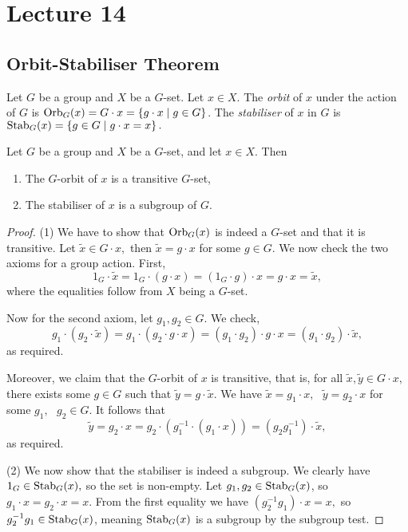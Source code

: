 \section{Lecture 14}
\subsection{Orbit-Stabiliser Theorem}
\begin{definition}
  Let $G$ be a group and $X$ be a $G$-set. Let $x\in X$. The \emph{orbit} of $x$ under the action of $G$ is
  $\operatorname*{Orb}_G (x)= G\cdot x = \left\{ g\cdot x \mid g\in G\right\}$.
  The \emph{stabiliser} of $x$ in $G$ is $\operatorname*{Stab}_G (x)=\left\{ g\in G \mid g\cdot x=x \right\}.$
  \label{def:orbStab}
\end{definition}


\begin{theorem}
  Let $G$ be a group and $X$ be a $G$-set, and let $x\in X.$ Then 
  \begin{enumerate}
    \item The $G$-orbit of $x$ is a transitive $G$-set,
    \item The stabiliser of $x$ is a subgroup of $G$.
  \end{enumerate}
  \label{<+label+>}
\end{theorem}
\begin{proof}
   (1) We have to show that $\operatorname*{Orb}_G(x)$ is indeed a $G$-set and that it is
  transitive. Let $\tilde{x}\in G\cdot x,$ then $\tilde{x}=g\cdot x$ for some $g\in G.$ We now check the two axioms for a group action.
  First,
  $$1_G\cdot \tilde{x}=1_G\cdot (g\cdot x)=(1_G\cdot g)\cdot x=g\cdot x=\tilde{x},$$
  where the equalities follow from $X$ being a $G$-set.

  Now for the second axiom, let $g_1,g_2\in G.$ We check,
  $$g_1\cdot (g_2 \cdot \tilde{x})=g_1\cdot (g_2\cdot g\cdot x)=(g_1\cdot g_2)\cdot g\cdot x=(g_1\cdot g_2)\cdot \tilde{x},$$
  as required.
  
  
  Moreover, we claim that the $G$-orbit of $x$ is transitive, that is, for all $\tilde{x},\tilde{y} \in G \cdot x,$ there exists some $g\in G$ such that $\tilde{y}=g\cdot \tilde{x}.$ We have $\tilde{x}=g_1\cdot x,\text{ } \tilde{y}=g_2\cdot x$ for some $g_1,\text{ }g_2\in G$. It follows that 
  $$\tilde{y}=g_2\cdot x = g_2 \cdot (g_{1}^{-1} \cdot (g_1 \cdot x)) = (g_2g_1^{-1}) \cdot \tilde{x},$$ 
  as required.

   (2) We now show that the stabiliser is indeed a subgroup. We clearly have $1_G\in\operatorname*{Stab}_G(x),$ so the set is non-empty. Let $g_1,g_2\in\operatorname*{Stab}_G(x)$, so $g_1\cdot x=g_2\cdot x=x.$ 
   From the first equality we have $(g_2^{-1} g_1)\cdot x = x,$ so $g_2^{-1} g_1 \in \operatorname*{Stab}_G(x)$, meaning $\operatorname*{Stab}_G(x)$ is a subgroup by the subgroup test.
\end{proof}


